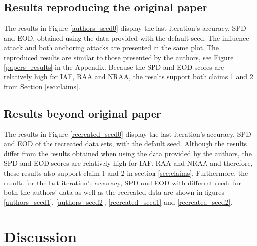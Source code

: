 \subsection{Results reproducing the original paper}
\label{results og}
The results in Figure \ref{authors_seed0}  display the last iteration's accuracy, SPD and EOD, obtained using the data provided with the default seed. 
The influence attack and both anchoring attacks are presented in the same plot. The reproduced results are similar to those presented by the authors, see Figure \ref{papers_results} in the Appendix.
Because the SPD and EOD scores are relatively high for IAF, RAA and NRAA, the results support both claims 1 and 2 from Section \ref{sec:claims}.


\subsection{Results beyond original paper}
\label{results ext}
The results in Figure \ref{recreated_seed0} display the last iteration's accuracy, SPD and EOD of the recreated data sets, with the default seed. 
Although the results differ from the results obtained when using the data provided by the authors, the SPD and EOD scores are relatively high for IAF, RAA and NRAA and therefore, these results also support claim 1 and 2 in section \ref{sec:claims}. Furthermore, the results for the last iteration's accuracy, SPD and EOD with different seeds for both the authors' data as well as the recreated data are shown in figures \ref{authors_seed1}, \ref{authors_seed2}, \ref{recreated_seed1} and \ref{recreated_seed2}.


\section{Discussion}
\label{discussion}

